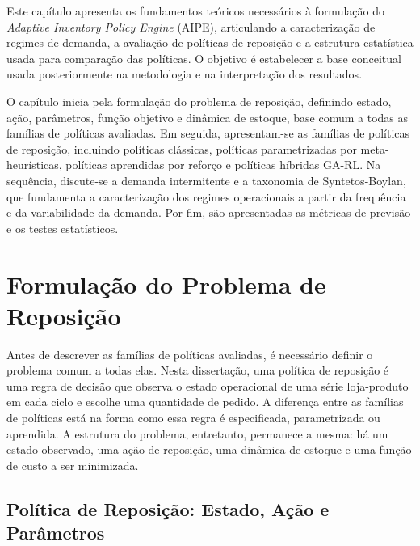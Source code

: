 
Este capítulo apresenta os fundamentos teóricos necessários à formulação do \textit{Adaptive Inventory Policy Engine} (AIPE), articulando a caracterização de regimes de demanda, a avaliação de políticas de reposição e a estrutura estatística usada para comparação das políticas. O objetivo é estabelecer a base conceitual usada posteriormente na metodologia e na interpretação dos resultados.

O capítulo inicia pela formulação do problema de reposição, definindo estado, ação, parâmetros, função objetivo e dinâmica de estoque, base comum a todas as famílias de políticas avaliadas. Em seguida, apresentam-se as famílias de políticas de reposição, incluindo políticas clássicas, políticas parametrizadas por meta-heurísticas, políticas aprendidas por reforço e políticas híbridas GA-RL. Na sequência, discute-se a demanda intermitente e a taxonomia de Syntetos-Boylan, que fundamenta a caracterização dos regimes operacionais a partir da frequência e da variabilidade da demanda. Por fim, são apresentadas as métricas de previsão e os testes estatísticos.

\section{Formulação do Problema de Reposição}
\label{sec:formulacao_problema}

Antes de descrever as famílias de políticas avaliadas, é necessário definir o problema comum a todas elas. Nesta dissertação, uma política de reposição é uma regra de decisão que observa o estado operacional de uma série loja-produto em cada ciclo e escolhe uma quantidade de pedido. A diferença entre as famílias de políticas está na forma como essa regra é especificada, parametrizada ou aprendida. A estrutura do problema, entretanto, permanece a mesma: há um estado observado, uma ação de reposição, uma dinâmica de estoque e uma função de custo a ser minimizada.

\subsection{Política de Reposição: Estado, Ação e Parâmetros}
\label{sec:estado_acao_parametros}

